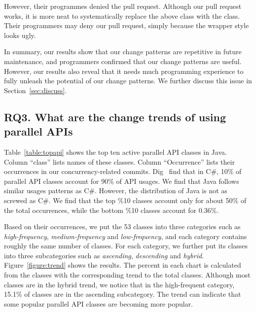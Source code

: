 However, their programmes denied the pull request. Although our pull request works, it is more neat to systematically replace the above  class with the  class. Their programmers may deny our pull request, simply because the wrapper style looks ugly.

In summary, our results show that our change patterns are repetitive in future maintenance, and programmers confirmed that our change patterns are useful. However, our results also reveal that it needs much programming experience to fully unleash the potential of our change patterns. We further discuss this issue in Section~\ref{sec:discuss}.

\subsection{RQ3. What are the change trends of using parallel APIs}
\label{sec:result:trend}


%
Table~\ref{table:topapi} shows the top ten active parallel API classes in Java. Column ``class'' lists names of these classes. Column ``Occurrence'' lists their occurrences in our concurrency-related commits. Dig~\cite{conf/sigsoft/OkurD12} find that in C\#, 10\% of parallel API classes account for 90\% of API usages. We find that Java follows similar usages patterns as C\#. However, the distribution of Java is not as screwed as C\#. We find that the top \%10 classes account only for about 50\% of the total occurrences, while the bottom \%10 classes account for 0.36\%.

Based on their occurrences, we put the 53 classes into three categories such as \emph{high-frequency}, \emph{medium-frequency} and \emph{low-frequency}, and each category contains roughly the same number of classes. For each category, we further put its classes into three subcategories such as \emph{ascending}, \emph{descending} and \emph{hybrid}. Figure~\ref{figure:trend} shows the results. The percent in each chart is calculated from the classes with the corresponding trend to the total classes. Although most classes are in the hybrid trend, we notice that in the high-frequent category, 15.1\% of classes are in the ascending subcategory. The trend can indicate that some popular parallel API classes are becoming more popular.

